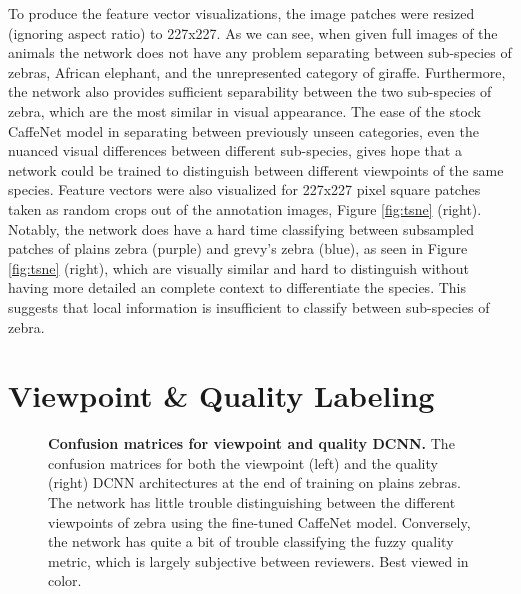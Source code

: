 To produce the feature vector visualizations, the image patches were resized (ignoring aspect ratio) to 227x227.  As we can see, when given full images of the animals the network does not have any problem separating between sub-species of zebras, African elephant, and the unrepresented category of giraffe.  Furthermore, the network also provides sufficient separability between the two sub-species of zebra, which are the most similar in visual appearance.  The ease of the stock CaffeNet model in separating between previously unseen categories, even the nuanced visual differences between different sub-species, gives hope that a network could be trained to distinguish between different viewpoints of the same species.  Feature vectors were also visualized for 227x227 pixel square patches taken as random crops out of the annotation images, Figure \ref{fig:tsne} (right).  Notably, the network does have a hard time classifying between subsampled patches of plains zebra (purple) and grevy's zebra (blue), as seen in Figure \ref{fig:tsne} (right), which are visually similar and hard to distinguish without having more detailed an complete context to differentiate the species.  This suggests that local information is insufficient to classify between sub-species of zebra.

\section{Viewpoint \& Quality Labeling}

\begin{figure}[t]%
	\centering
    	\caption[Confusion Matrices for Viewpoint and Quality DCNN]{\textbf{Confusion matrices for viewpoint and quality DCNN.}  The confusion matrices for both the viewpoint (left) and the quality (right) DCNN architectures at the end of training on plains zebras.  The network has little trouble distinguishing between the different viewpoints of zebra using the fine-tuned CaffeNet model.  Conversely, the network has quite a bit of trouble classifying the fuzzy quality metric, which is largely subjective between reviewers.  Best viewed in color.}
    	\label{fig:confusion}
\end{figure}

